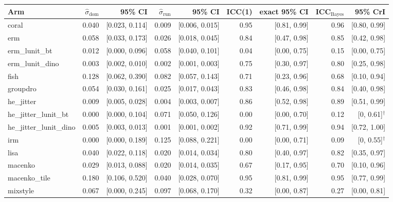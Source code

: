 \begin{tabular}{lrrrrrrrr}
\toprule
Arm & $\hat\sigma_\text{dom}$ & 95\% CI & $\hat\sigma_\text{run}$ & 95\% CI & ICC(1) & exact 95\% CI & ICC$_\text{Bayes}$ & 95\% CrI \\
\midrule
coral & 0.040 & [0.023, 0.114] & 0.009 & [0.006, 0.015] & 0.95 & [0.81, 0.99] & 0.96 & [0.80, 0.99] \\
erm & 0.058 & [0.033, 0.173] & 0.026 & [0.018, 0.045] & 0.84 & [0.47, 0.98] & 0.85 & [0.42, 0.98] \\
erm\_lunit\_bt & 0.012 & [0.000, 0.096] & 0.058 & [0.040, 0.101] & 0.04 & [0.00, 0.75] & 0.15 & [0.00, 0.75] \\
erm\_lunit\_dino & 0.003 & [0.002, 0.010] & 0.002 & [0.001, 0.003] & 0.75 & [0.30, 0.97] & 0.80 & [0.25, 0.98] \\
fish & 0.128 & [0.062, 0.390] & 0.082 & [0.057, 0.143] & 0.71 & [0.23, 0.96] & 0.68 & [0.10, 0.94] \\
groupdro & 0.054 & [0.030, 0.161] & 0.025 & [0.017, 0.043] & 0.83 & [0.46, 0.98] & 0.84 & [0.40, 0.98] \\
he\_jitter & 0.009 & [0.005, 0.028] & 0.004 & [0.003, 0.007] & 0.86 & [0.52, 0.98] & 0.89 & [0.51, 0.99] \\
he\_jitter\_lunit\_bt & 0.000 & [0.000, 0.104] & 0.071 & [0.050, 0.126] & 0.00 & [0.00, 0.70] & 0.12 & [0, 0.61]$^\dagger$ \\
he\_jitter\_lunit\_dino & 0.005 & [0.003, 0.013] & 0.001 & [0.001, 0.002] & 0.92 & [0.71, 0.99] & 0.94 & [0.72, 1.00] \\
irm & 0.000 & [0.000, 0.189] & 0.125 & [0.088, 0.221] & 0.00 & [0.00, 0.71] & 0.09 & [0, 0.55]$^\dagger$ \\
lisa & 0.040 & [0.022, 0.118] & 0.020 & [0.014, 0.034] & 0.80 & [0.40, 0.97] & 0.82 & [0.35, 0.97] \\
macenko & 0.029 & [0.013, 0.088] & 0.020 & [0.014, 0.035] & 0.67 & [0.17, 0.95] & 0.70 & [0.10, 0.96] \\
macenko\_tile & 0.180 & [0.106, 0.520] & 0.040 & [0.028, 0.070] & 0.95 & [0.81, 0.99] & 0.95 & [0.77, 0.99] \\
mixstyle & 0.067 & [0.000, 0.245] & 0.097 & [0.068, 0.170] & 0.32 & [0.00, 0.87] & 0.27 & [0.00, 0.81] \\

\end{tabular}
